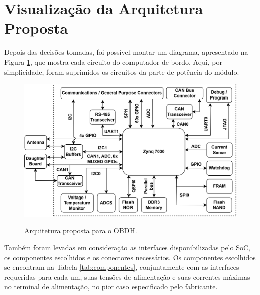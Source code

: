 \section{Visualização da Arquitetura Proposta}

Depois das decisões tomadas, foi possível montar um diagrama, apresentado na Figura \ref{fig:arq}, que mostra cada circuito do computador de bordo. Aqui, por simplicidade, foram suprimidos os circuitos da parte de potência do módulo.

\begin{figure}[H]
    \centering
    \caption{Arquitetura proposta para o OBDH.}
    \includegraphics[scale=1]{images/arquitetura final.png}
    \label{fig:arq}
\end{figure}

Também foram levadas em consideração as interfaces disponibilizadas pelo SoC, os componentes escolhidos e os conectores necessários. Os componentes escolhidos se encontram na Tabela \ref{tab:componentes}, conjuntamente com as interfaces requeridas para cada um, suas tensões de alimentação e suas correntes máximas no terminal de alimentação, no pior caso especificado pelo fabricante.

